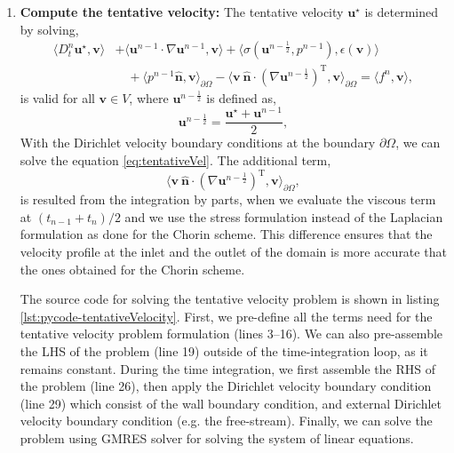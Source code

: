 	\begin{enumerate}
	\item \textbf{Compute the tentative velocity:} The tentative velocity $\mathbf{u}^{\star}$ is determined by solving,
		\begin{equation}
		\begin{split}
		\langle D_t^n \mathbf{u}^{\star}, \mathbf{v} \rangle &+ \langle \mathbf{u}^{n-1}\cdot\nabla\mathbf{u}^{n-1},\mathbf{v}\rangle + \langle \sigma(\mathbf{u}^{n-\frac{1}{2}},p^{n-1}), \epsilon(\mathbf{v}) \rangle \quad \\ &\quad+ \langle p^{n-1}\hat{\mathbf{n}},\mathbf{v}\rangle_{\partial \Omega} - \langle \mathbf{v}\ \hat{\mathbf{n}} \cdot (\nabla \mathbf{u}^{n-\frac{1}{2}} )^{\mathrm{T}},\mathbf{v} \rangle_{\partial \Omega} = \langle f^n,\mathbf{v} \rangle,
		\end{split}
		\label{eq:tentativeVel}
		\end{equation}
	is valid for all $\mathbf{v} \in V$, where $\mathbf{u}^{n-\frac{1}{2}}$ is defined as,
		\begin{equation}
		\mathbf{u}^{n-\frac{1}{2}} = \frac{\mathbf{u}^{\star}+\mathbf{u}^{n-1}}{2},
		\end{equation}
	With the Dirichlet velocity boundary conditions at the boundary $\partial \Omega$, we can solve the equation \ref{eq:tentativeVel}. The additional term,
		\begin{equation}
		\langle \mathbf{v}\ \hat{\mathbf{n}} \cdot (\nabla \mathbf{u}^{n-\frac{1}{2}} )^{\mathrm{T}},\mathbf{v} \rangle_{\partial \Omega},
		\end{equation}
	is resulted from the integration by parts, when we evaluate the viscous term at $(t_{n-1} + t_n)/2$ and we use the stress formulation instead of the Laplacian formulation as done for the Chorin scheme. This difference ensures that the velocity profile at the inlet and the outlet of the domain is more accurate that the ones obtained for the Chorin scheme. 
	
	The source code for solving the tentative velocity problem is shown in listing \ref{lst:pycode-tentativeVelocity}. First, we pre-define all the terms need for the tentative velocity problem formulation (lines \numrange{3}{16}). We can also pre-assemble the LHS of the problem (line 19) outside of the time-integration loop, as it remains constant. During the time integration, we first assemble the RHS of the problem (line 26), then apply the Dirichlet velocity boundary condition (line 29) which consist of the wall boundary condition, and external Dirichlet velocity boundary condition (e.g. the free-stream). Finally, we can solve the problem using GMRES solver for solving the system of linear equations.
	

\end{enumerate}

